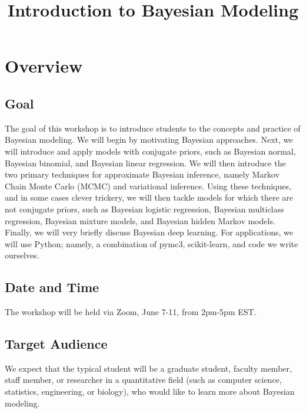\documentclass{article} %
\begin{document}
\title{Introduction to Bayesian Modeling} 

\maketitle

\tableofcontents
\newpage

\section{Overview}

\subsection{Goal}  The goal of this workshop is to introduce students to the concepts and practice of Bayesian modeling.   We will begin by motivating Bayesian approaches.  Next,  we will introduce and apply models with conjugate priors,  such as Bayesian normal,  Bayesian binomial,  and Bayesian linear regression.   We will then introduce the two primary techniques for approximate Bayesian inference,  namely Markov Chain Monte Carlo (MCMC) and variational inference.    Using these techniques,  and in some cases clever trickery,  we will then tackle models for which there are not conjugate priors,  such as Bayesian logistic regression,  Bayesian multiclass regression,  Bayesian mixture models,  and Bayesian hidden Markov models.  Finally,  we will very briefly discuss Bayesian deep learning.    For applications,  we will use Python; namely,  a combination of  pymc3,  scikit-learn,  and code we write ourselves.  
 
\subsection{Date and Time}  The workshop will be held via Zoom,  June 7-11,  from 2pm-5pm EST.   
 
\subsection{Target Audience}  We expect that the typical student will be a graduate student, faculty member, staff member, or researcher in a quantitative field (such as computer science,  statistics,  engineering, or biology),  who would like to learn more about Bayesian modeling.  
\end{document}
